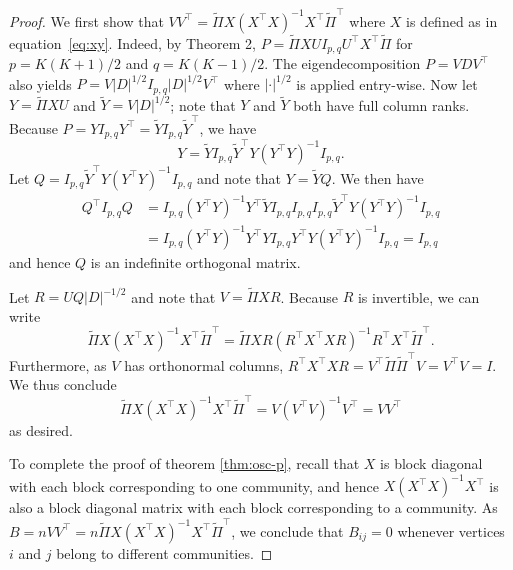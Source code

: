 \documentclass[
  12pt,
]{article}
\theoremstyle{definition}
\theoremstyle{definition}
\theoremstyle{definition}
\theoremstyle{definition}
\theoremstyle{remark}
\begin{document}
\begin{proof}
We first show that $V V^\top =
\tilde{\Pi} X (X^\top X)^{-1} X^\top \tilde{\Pi}^{\top} $ where $X$ is 
defined as in equation~\eqref{eq:xy}. Indeed, by Theorem 2, 
\(P = \tilde{\Pi} X U I_{p, q} U^\top X^\top \tilde{\Pi}\) for $p = K(K+1)/2$ and $q = K(K-1)/2$. 
The eigendecomposition \(P = V D V^\top\) also yields $P = V
|D|^{1/2} I_{p, q} |D|^{1/2} V^\top$ where \(|\cdot|^{1/2}\) is
applied entry-wise. Now let $Y = \tilde{\Pi} XU$ and $\tilde{Y} = V|D|^{1/2}$; note that
$Y$ and $\tilde{Y}$ both have full column ranks. 
Because $P = Y I_{p,q} Y^{\top} = \tilde{Y} I_{p,q} \tilde{Y}^{\top}$, we have
$$Y = \tilde{Y} I_{p,q} \tilde{Y}^{\top} Y (Y^{\top} Y)^{-1} I_{p,q}.$$
Let $Q = I_{p,q} \tilde{Y}^{\top} Y (Y^{\top} Y)^{-1} I_{p,q}$ and note that
$Y = \tilde{Y} Q$. We then have
\begin{equation*}
\begin{split}
Q^{\top} I_{p,q} Q &= I_{p,q} (Y^{\top} Y)^{-1} Y^{\top} \tilde{Y} I_{p,q}
I_{p,q} I_{p,q} \tilde{Y}^{\top} Y (Y^{\top} Y)^{-1} I_{p,q} \\ 
&= I_{p,q} (Y^{\top} Y)^{-1} Y^{\top} Y I_{p,q}
Y^{\top} Y (Y^{\top} Y)^{-1} I_{p,q} =  I_{p,q}
\end{split}
\end{equation*}
and hence $Q$ is an indefinite orthogonal matrix. 

Let $R = U Q |D|^{-1/2}$ and note that $V = \tilde{\Pi} XR$. Because $R$ is
invertible, we can write
$$\tilde{\Pi} X (X^{\top} X)^{-1} X^{\top} \tilde{\Pi}^{\top} =
\tilde{\Pi} X R (R^{\top} X^{\top} X R)^{-1}
R^{\top} X^{\top} \tilde{\Pi}^{\top}.$$ 
Furthermore, as $V$ has orthonormal columns, $R^{\top} X^{\top} X R =
V^{\top} \tilde{\Pi} \tilde{\Pi}^{\top} V = V^{\top} V = I$. We thus conclude
$$\tilde{\Pi} X (X^{\top} X)^{-1} X^{\top} \tilde{\Pi}^{\top} = V (V^{\top} V)^{-1} V^{\top} = V V^{\top}$$
as desired.

To complete the proof of theorem \ref{thm:osc-p}, recall that \(X\) 
is block diagonal with each block corresponding to one community, 
and hence \(X (X^\top X)^{-1} X^\top\) is also a
block diagonal matrix with each block corresponding to a community. 
As $B = n VV^{\top} = n \tilde{\Pi} X (X^\top X)^{-1} X^\top \tilde{\Pi}^{\top}$, 
we conclude that $B_{ij} = 0$ 
whenever vertices $i$ and $j$ belong to different communities.  
\end{proof}
\end{document}
